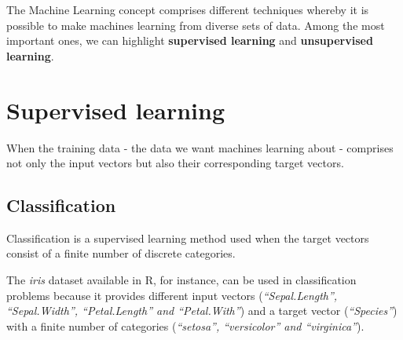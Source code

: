 \documentclass[]{book}
\begin{document}
The Machine Learning concept comprises different techniques whereby it
is possible to make machines learning from diverse sets of data. Among
the most important ones, we can highlight \textbf{supervised learning}
and \textbf{unsupervised learning}.

\section{Supervised learning}\label{supervised-learning}

When the training data - the data we want machines learning about -
comprises not only the input vectors but also their corresponding target
vectors.

\subsection{Classification}\label{classification}

Classification is a supervised learning method used when the target
vectors consist of a finite number of discrete categories.

The \emph{iris} dataset available in R, for instance, can be used in
classification problems because it provides different input vectors
(\emph{``Sepal.Length'', ``Sepal.Width'', ``Petal.Length'' and
``Petal.With''}) and a target vector (\emph{``Species''}) with a finite
number of categories (\emph{``setosa'', ``versicolor'' and
``virginica''}).
\end{document}
